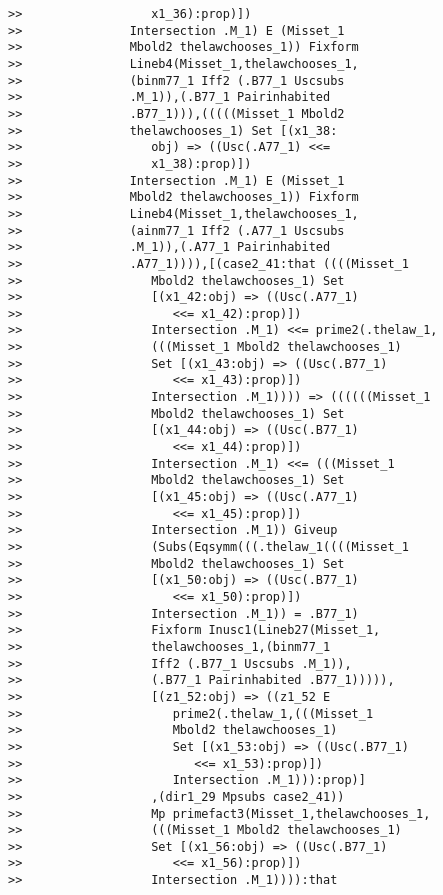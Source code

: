 \documentclass[12pt]{article}
\begin{document}
\begin{verbatim}
>>                  x1_36):prop)])
>>               Intersection .M_1) E (Misset_1
>>               Mbold2 thelawchooses_1)) Fixform
>>               Lineb4(Misset_1,thelawchooses_1,
>>               (binm77_1 Iff2 (.B77_1 Uscsubs
>>               .M_1)),(.B77_1 Pairinhabited
>>               .B77_1))),(((((Misset_1 Mbold2
>>               thelawchooses_1) Set [(x1_38:
>>                  obj) => ((Usc(.A77_1) <<=
>>                  x1_38):prop)])
>>               Intersection .M_1) E (Misset_1
>>               Mbold2 thelawchooses_1)) Fixform
>>               Lineb4(Misset_1,thelawchooses_1,
>>               (ainm77_1 Iff2 (.A77_1 Uscsubs
>>               .M_1)),(.A77_1 Pairinhabited
>>               .A77_1)))),[(case2_41:that ((((Misset_1
>>                  Mbold2 thelawchooses_1) Set
>>                  [(x1_42:obj) => ((Usc(.A77_1)
>>                     <<= x1_42):prop)])
>>                  Intersection .M_1) <<= prime2(.thelaw_1,
>>                  (((Misset_1 Mbold2 thelawchooses_1)
>>                  Set [(x1_43:obj) => ((Usc(.B77_1)
>>                     <<= x1_43):prop)])
>>                  Intersection .M_1)))) => ((((((Misset_1
>>                  Mbold2 thelawchooses_1) Set
>>                  [(x1_44:obj) => ((Usc(.B77_1)
>>                     <<= x1_44):prop)])
>>                  Intersection .M_1) <<= (((Misset_1
>>                  Mbold2 thelawchooses_1) Set
>>                  [(x1_45:obj) => ((Usc(.A77_1)
>>                     <<= x1_45):prop)])
>>                  Intersection .M_1)) Giveup
>>                  (Subs(Eqsymm(((.thelaw_1((((Misset_1
>>                  Mbold2 thelawchooses_1) Set
>>                  [(x1_50:obj) => ((Usc(.B77_1)
>>                     <<= x1_50):prop)])
>>                  Intersection .M_1)) = .B77_1)
>>                  Fixform Inusc1(Lineb27(Misset_1,
>>                  thelawchooses_1,(binm77_1
>>                  Iff2 (.B77_1 Uscsubs .M_1)),
>>                  (.B77_1 Pairinhabited .B77_1))))),
>>                  [(z1_52:obj) => ((z1_52 E
>>                     prime2(.thelaw_1,(((Misset_1
>>                     Mbold2 thelawchooses_1)
>>                     Set [(x1_53:obj) => ((Usc(.B77_1)
>>                        <<= x1_53):prop)])
>>                     Intersection .M_1))):prop)]
>>                  ,(dir1_29 Mpsubs case2_41))
>>                  Mp primefact3(Misset_1,thelawchooses_1,
>>                  (((Misset_1 Mbold2 thelawchooses_1)
>>                  Set [(x1_56:obj) => ((Usc(.B77_1)
>>                     <<= x1_56):prop)])
>>                  Intersection .M_1)))):that

\end{verbatim}
\end{document}
